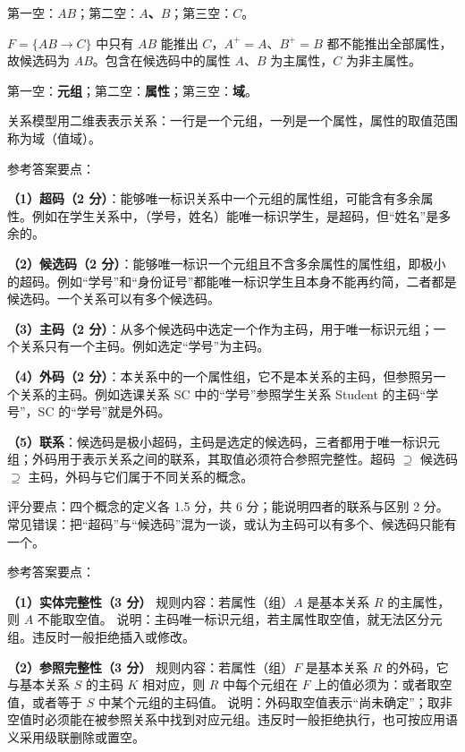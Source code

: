 \documentclass[a4paper,11pt]{article}
\begin{document}
\q 第一空：\textbf{$AB$}；第二空：\textbf{$A$、$B$}；第三空：\textbf{$C$}。\begin{analysis}$F=\{AB\to C\}$ 中只有 $AB$ 能推出 $C$，$A^{+}=A$、$B^{+}=B$ 都不能推出全部属性，故候选码为 $AB$。包含在候选码中的属性 $A$、$B$ 为主属性，$C$ 为非主属性。\end{analysis}

\q 第一空：\textbf{元组}；第二空：\textbf{属性}；第三空：\textbf{域}。\begin{analysis}关系模型用二维表表示关系：一行是一个元组，一列是一个属性，属性的取值范围称为域（值域）。\end{analysis}


\q 参考答案要点：

\textbf{（1）超码（2 分）}：能够唯一标识关系中一个元组的属性组，可能含有多余属性。例如在学生关系中，（学号，姓名）能唯一标识学生，是超码，但“姓名”是多余的。

\textbf{（2）候选码（2 分）}：能够唯一标识一个元组且不含多余属性的属性组，即极小的超码。例如“学号”和“身份证号”都能唯一标识学生且本身不能再约简，二者都是候选码。一个关系可以有多个候选码。

\textbf{（3）主码（2 分）}：从多个候选码中选定一个作为主码，用于唯一标识元组；一个关系只有一个主码。例如选定“学号”为主码。

\textbf{（4）外码（2 分）}：本关系中的一个属性组，它不是本关系的主码，但参照另一个关系的主码。例如选课关系 SC 中的“学号”参照学生关系 Student 的主码“学号”，SC 的“学号”就是外码。

\textbf{（5）联系}：候选码是极小超码，主码是选定的候选码，三者都用于唯一标识元组；外码用于表示关系之间的联系，其取值必须符合参照完整性。超码 $\supseteq$ 候选码 $\supseteq$ 主码，外码与它们属于不同关系的概念。
\begin{analysis}评分要点：四个概念的定义各 1.5 分，共 6 分；能说明四者的联系与区别 2 分。常见错误：把“超码”与“候选码”混为一谈，或认为主码可以有多个、候选码只能有一个。\end{analysis}

\q 参考答案要点：

\textbf{（1）实体完整性（3 分）}
规则内容：若属性（组）$A$ 是基本关系 $R$ 的主属性，则 $A$ 不能取空值。
说明：主码唯一标识元组，若主属性取空值，就无法区分元组。违反时一般拒绝插入或修改。

\textbf{（2）参照完整性（3 分）}
规则内容：若属性（组）$F$ 是基本关系 $R$ 的外码，它与基本关系 $S$ 的主码 $K$ 相对应，则 $R$ 中每个元组在 $F$ 上的值必须为：或者取空值，或者等于 $S$ 中某个元组的主码值。
说明：外码取空值表示“尚未确定”；取非空值时必须能在被参照关系中找到对应元组。违反时一般拒绝执行，也可按应用语义采用级联删除或置空。
\end{document}
